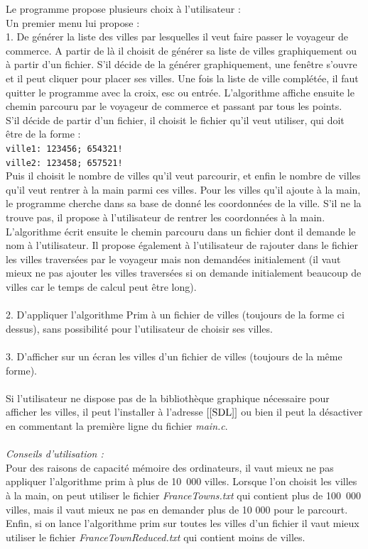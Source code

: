 \documentclass[a4paper,11pt]{article}
\begin{document}
Le programme propose plusieurs choix à l'utilisateur :\\
Un premier menu lui propose :\\
1. De générer la liste des villes par lesquelles il veut faire passer le voyageur de commerce.
A partir de là il choisit de générer sa liste de villes graphiquement ou à partir d'un fichier. S'il décide de la générer graphiquement, une fenêtre s'ouvre et il peut cliquer pour placer ses villes. Une fois la liste de ville complétée, il faut quitter le programme avec la croix, esc ou entrée. L'algorithme affiche ensuite le chemin parcouru par le voyageur de commerce et passant par tous les points.\\
S'il décide de partir d'un fichier, il choisit le fichier qu'il veut utiliser, qui doit être de la forme : \\
\texttt{ville1: 123456; 654321!}\\
\texttt{ville2: 123458; 657521!}\\
Puis il choisit le nombre de villes qu'il veut parcourir, et enfin le nombre de villes qu'il veut rentrer à la main parmi ces villes. Pour les villes qu'il ajoute à la main, le programme cherche dans sa base de donné les coordonnées de la ville. S'il ne la trouve pas, il propose à l'utilisateur de rentrer les coordonnées à la main. L'algorithme écrit ensuite le chemin parcouru dans un fichier dont il demande le nom à l'utilisateur. Il propose également à l'utilisateur de rajouter dans le fichier les villes traversées par le voyageur mais non demandées initialement (il vaut mieux ne pas ajouter les villes traversées si on demande initialement beaucoup de villes car le temps de calcul peut être long).\\
\\
2. D'appliquer l'algorithme Prim à un fichier de villes (toujours de la forme ci dessus), sans possibilité pour l'utilisateur de choisir ses villes.\\
\\
3. D'afficher sur un écran les villes d'un fichier de villes (toujours de la même forme).\\
\\
Si l'utilisateur ne dispose pas de la bibliothèque graphique nécessaire pour afficher les villes, il peut l'installer à l'adresse $\left[\ref{SDL}\right]$ ou bien il peut la désactiver en commentant la première ligne du fichier \textit{main.c}.\\
\\
\textit{Conseils d'utilisation : }\\
Pour des raisons de capacité mémoire des ordinateurs, il vaut mieux ne pas appliquer l'algorithme prim à plus de 10~000 villes.
Lorsque l'on choisit les villes à la main, on peut utiliser le fichier \textit{FranceTowns.txt} qui contient plus de 100~000 villes, mais il vaut mieux ne pas en demander plus de 10 000 pour le parcourt.
Enfin, si on lance l'algorithme prim sur toutes les villes d'un fichier il vaut mieux utiliser le fichier \textit{FranceTownReduced.txt} qui contient moins de villes.
\end{document}
